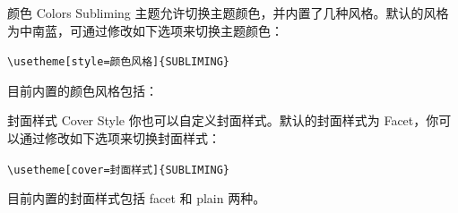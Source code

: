 \documentclass[10pt,aspectratio=169,fontset=none]{ctexbeamer}
\begin{document}
    \begin{frame}{颜色 Colors}
        Subliming 主题允许切换主题颜色，并内置了几种风格。默认的风格为中南蓝，可通过修改如下选项来切换主题颜色：
        
        \begin{center}
            \texttt{\textcolor{primary}{\textbackslash usetheme}[style=颜色风格]\alert{\{SUBLIMING\}}}
        \end{center}
        
        目前内置的颜色风格包括：

       
    \end{frame}
    
    \begin{frame}{封面样式 Cover Style}
        你也可以自定义封面样式。默认的封面样式为 Facet，你可以通过修改如下选项来切换封面样式：
        \begin{center}
            \texttt{\textcolor{primary}{\textbackslash usetheme}[cover=封面样式]\alert{\{SUBLIMING\}}}
        \end{center}

        目前内置的封面样式包括 facet 和 plain 两种。
    \end{frame}
\end{document}
